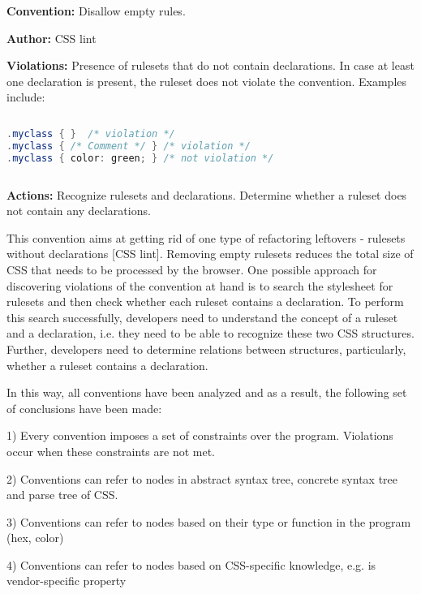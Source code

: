 \documentclass[parskip=full]{uvamscse}
\begin{document}
\begin{description}
\item \textbf{Convention:} Disallow empty rules.
\item \textbf{Author:} CSS lint
\item \textbf{Violations:} Presence of rulesets that do not contain declarations. In case at least one declaration is present, the ruleset does not violate the convention. Examples include:
\begin{sourcecode}
\begin{lstlisting}[style=mono,language=Java]
.myclass { }  /* violation */
.myclass { /* Comment */ } /* violation */
.myclass { color: green; } /* not violation */
\end{lstlisting}
\end{sourcecode}

\item \textbf{Actions:} Recognize rulesets and declarations. Determine whether a ruleset does not contain any declarations.

\end{description}

This convention aims at getting rid of one type of refactoring leftovers - rulesets without
declarations [CSS lint]. Removing empty rulesets reduces the total size of CSS that needs to be
processed by the browser. One possible approach for discovering violations of the convention at hand
is to search the stylesheet for rulesets and then check whether each ruleset contains a declaration.
To perform this search successfully, developers need to understand the concept of a ruleset and a
declaration, i.e. they need to be able to recognize these two CSS structures. Further, developers
need to determine relations between structures, particularly, whether a ruleset contains a
declaration.

In this way, all conventions have been analyzed and as a result, the following set of conclusions
have been made:

1) Every convention imposes a set of constraints over the program. Violations occur when these
constraints are not met.

2) Conventions can refer to nodes in abstract syntax tree, concrete syntax tree and parse tree of
CSS.

3) Conventions can refer to nodes based on their type or function in the program (hex, color)

4) Conventions can refer to nodes based on CSS-specific knowledge, e.g. is vendor-specific property
\end{document}
